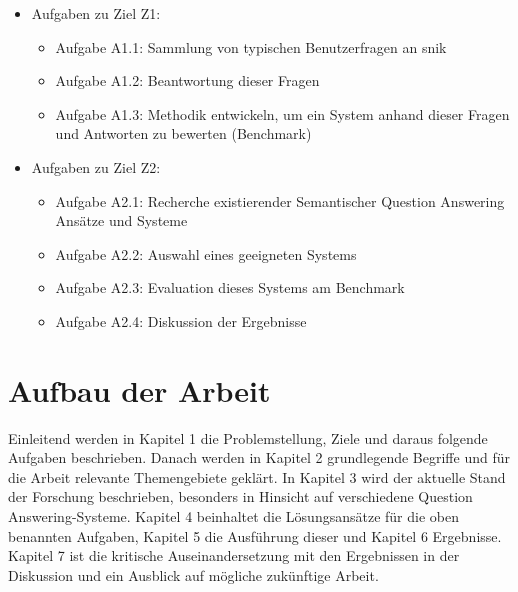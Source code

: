 \begin{itemize}

	\item Aufgaben zu Ziel Z1:
	\begin{itemize}
		\item Aufgabe A1.1: Sammlung von typischen Benutzerfragen an \acs{snik}
		\item Aufgabe A1.2: Beantwortung dieser Fragen
		\item Aufgabe A1.3: Methodik entwickeln, um ein System anhand dieser Fragen und Antworten zu bewerten (Benchmark)
	\end{itemize}
	\item Aufgaben zu Ziel Z2:
	\begin{itemize}
		\item Aufgabe A2.1: Recherche existierender Semantischer Question Answering Ansätze und Systeme
		\item Aufgabe A2.2: Auswahl eines geeigneten Systems
		\item Aufgabe A2.3: Evaluation dieses Systems am Benchmark
		\item Aufgabe A2.4: Diskussion der Ergebnisse
	\end{itemize}
\end{itemize}

\section{Aufbau der Arbeit}

Einleitend werden in Kapitel 1 die Problemstellung, Ziele und daraus folgende Aufgaben beschrieben.
Danach werden in Kapitel 2 grundlegende Begriffe und für die Arbeit relevante Themengebiete geklärt.
In Kapitel 3 wird der aktuelle Stand der Forschung beschrieben, besonders in Hinsicht auf verschiedene Question Answering-Systeme.
Kapitel 4 beinhaltet die Lösungsansätze für die oben benannten Aufgaben, Kapitel 5 die Ausführung dieser und Kapitel 6 Ergebnisse.
Kapitel 7 ist die kritische Auseinandersetzung mit den Ergebnissen in der Diskussion und ein Ausblick auf mögliche zukünftige Arbeit.

